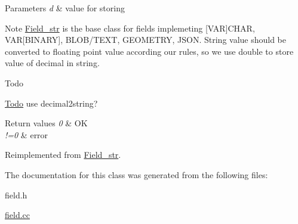 \begin{DoxyParams}{Parameters}
{\em d} & value for storing\\
\hline
\end{DoxyParams}
\begin{DoxyNote}{Note}
\mbox{\hyperlink{classField__str}{Field\+\_\+str}} is the base class for fields implemeting \mbox{[}V\+AR\mbox{]}C\+H\+AR, V\+AR\mbox{[}B\+I\+N\+A\+RY\mbox{]}, B\+L\+O\+B/\+T\+E\+XT, G\+E\+O\+M\+E\+T\+RY, J\+S\+ON. String value should be converted to floating point value according our rules, so we use double to store value of decimal in string.
\end{DoxyNote}
\begin{DoxyRefDesc}{Todo}
\item[\mbox{\hyperlink{todo__todo000011}{Todo}}]use decimal2string?\end{DoxyRefDesc}



\begin{DoxyRetVals}{Return values}
{\em 0} & OK \\
\hline
{\em !=0} & error \\
\hline
\end{DoxyRetVals}


Reimplemented from \mbox{\hyperlink{classField__str_ae0a260a3e657aa6778dcf651ff3e9b95}{Field\+\_\+str}}.



The documentation for this class was generated from the following files\+:\begin{DoxyCompactItemize}
\item 
field.\+h\item 
\mbox{\hyperlink{field_8cc}{field.\+cc}}\end{DoxyCompactItemize}
